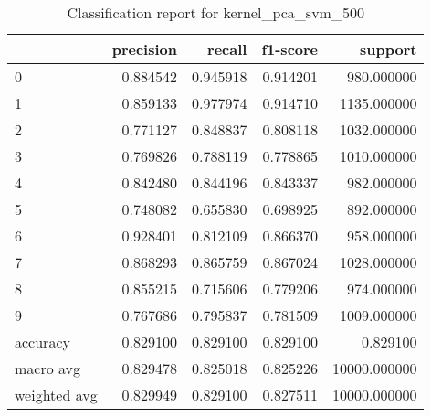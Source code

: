 \begin{table}[htb!]
\centering
\caption{Classification report for kernel_pca_svm_500}
\label{tab:classification-report-kernel_pca_svm_500}
\begin{tabular}{lrrrr}
\toprule
 & precision & recall & f1-score & support \\
\midrule
0 & 0.884542 & 0.945918 & 0.914201 & 980.000000 \\
1 & 0.859133 & 0.977974 & 0.914710 & 1135.000000 \\
2 & 0.771127 & 0.848837 & 0.808118 & 1032.000000 \\
3 & 0.769826 & 0.788119 & 0.778865 & 1010.000000 \\
4 & 0.842480 & 0.844196 & 0.843337 & 982.000000 \\
5 & 0.748082 & 0.655830 & 0.698925 & 892.000000 \\
6 & 0.928401 & 0.812109 & 0.866370 & 958.000000 \\
7 & 0.868293 & 0.865759 & 0.867024 & 1028.000000 \\
8 & 0.855215 & 0.715606 & 0.779206 & 974.000000 \\
9 & 0.767686 & 0.795837 & 0.781509 & 1009.000000 \\
accuracy & 0.829100 & 0.829100 & 0.829100 & 0.829100 \\
macro avg & 0.829478 & 0.825018 & 0.825226 & 10000.000000 \\
weighted avg & 0.829949 & 0.829100 & 0.827511 & 10000.000000 \\
\bottomrule
\end{tabular}
\end{table}
